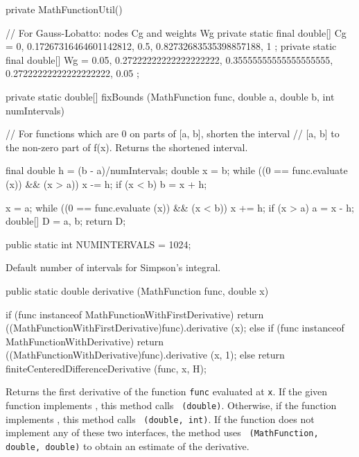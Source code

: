 \begin{code}\begin{hide}
   private MathFunctionUtil() {}

   // For Gauss-Lobatto: nodes Cg and weights Wg
   private static final double[] Cg = { 0, 0.17267316464601142812, 0.5,
                                           0.82732683535398857188, 1 };
   private static final double[] Wg = { 0.05, 0.27222222222222222222,
                  0.35555555555555555555, 0.27222222222222222222, 0.05 };


   private static double[] fixBounds (MathFunction func, double a,
                                      double b, int numIntervals) {
   // For functions which are 0 on parts of [a, b], shorten the interval
   // [a, b] to the non-zero part of f(x). Returns the shortened interval.

       final double h = (b - a)/numIntervals;
       double x = b;
       while ((0 == func.evaluate (x)) && (x > a))
           x -= h;
       if (x < b)
           b = x + h;

       x = a;
       while ((0 == func.evaluate (x)) && (x < b))
           x += h;
       if (x > a)
          a = x - h;
       double[] D = {a, b};
       return D;
   }\end{hide}

   public static int NUMINTERVALS = 1024;
\end{code}
\begin{tabb} Default number of intervals for Simpson's integral.
\end{tabb}
\begin{code}

   public static double derivative (MathFunction func, double x)\begin{hide} {
      if (func instanceof MathFunctionWithFirstDerivative)
         return ((MathFunctionWithFirstDerivative)func).derivative (x);
      else if (func instanceof MathFunctionWithDerivative)
         return ((MathFunctionWithDerivative)func).derivative (x, 1);
      else
         return finiteCenteredDifferenceDerivative (func, x, H);
   }\end{hide}
\end{code}
\begin{tabb}   Returns the first derivative of the function \texttt{func}
 evaluated at \texttt{x}. If the given function implements
 , this method calls
~\texttt{(double)}.
 Otherwise, if the function implements ,
 this method calls
~\texttt{(double, int)}.
If the function does not implement any of these two interfaces, the method
 uses ~\texttt{(MathFunction,
 double, double)} to obtain an estimate of the derivative.
\end{tabb}
